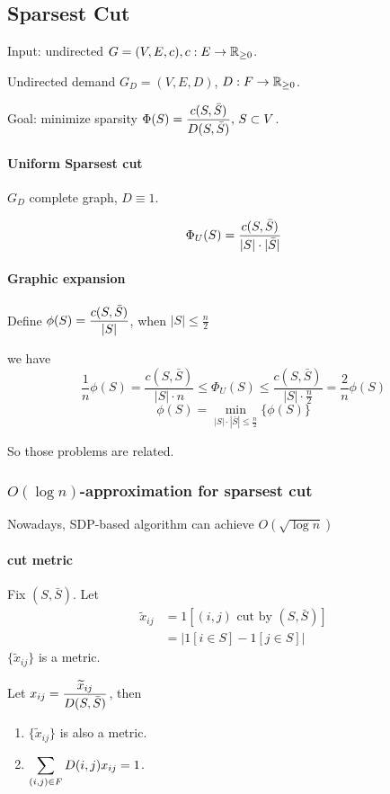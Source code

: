 \subsection{Sparsest Cut}
\begin{example}
    Input: undirected  $ G=(V,E,c),c:E\rightarrow \mathbb R_{ \geq 0} $. 

    Undirected demand  $ G_D=(V,E,D) $,  $ D:F\rightarrow \mathbb R_{ \geq 0} $. 
    
    Goal: minimize sparsity   $ \Phi(S)=\displaystyle\frac{c(S,\bar{S})}{D(S,\bar{S})}, \, S\subset V $. 
\end{example}

\paragraph{Uniform Sparsest cut}  $ G_D $ complete graph,  $ D\equiv 1 $.

\[\Phi_U(S)=\displaystyle\frac{c(S,\bar{S})}{|S|\cdot |\bar{S}|} \]

\paragraph{Graphic expansion}

Define  $ \phi(S)=\displaystyle\frac{c(S,\bar{S})}{|S|} $, when  $ |S| \leq \frac{n}2 $ 

we have
\[\frac{1}{n}\phi(S)=\frac{c(S,\bar{S})}{|S|\cdot n} \leq \Phi_U(S) \leq \frac{c(S,\bar{S})}{|S|\cdot \frac{n}{2}}=\frac{2}{n}\phi(S)\]
\[\phi(S)=\min_{|S|\cdot |\bar{S}| \leq \frac{n}{2}}\{\phi(S)\}\]

So those problems are related.

\subsubsection{$ O(\log n) $-approximation for sparsest cut}
Nowadays, SDP-based algorithm can achieve  $ O(\sqrt{\log n}) $ 

\paragraph{cut metric} Fix  $ (S,\bar{S}) $. Let 
\[\begin{aligned}
    \tilde{x}_{ij}&=1[(i,j)\text{ cut by }(S,\bar{S})]\\
    &=|1[i\in S]-1[j\in S]|
\end{aligned}\] 
$ \{\tilde{x}_{ij}\} $ is a metric. 

Let  $ x_{ij}=\displaystyle\frac{\widetilde{x}_{ij}}{D(S,\bar{S})} $, then 
\begin{enumerate}[label=\arabic*)]
    \item  $ \{\tilde{x}_{ij}\} $ is also a metric.
    \item  $ \displaystyle\sum_{(i,j)\in F}D(i,j)x_{ij}=1 $.  
\end{enumerate} 


